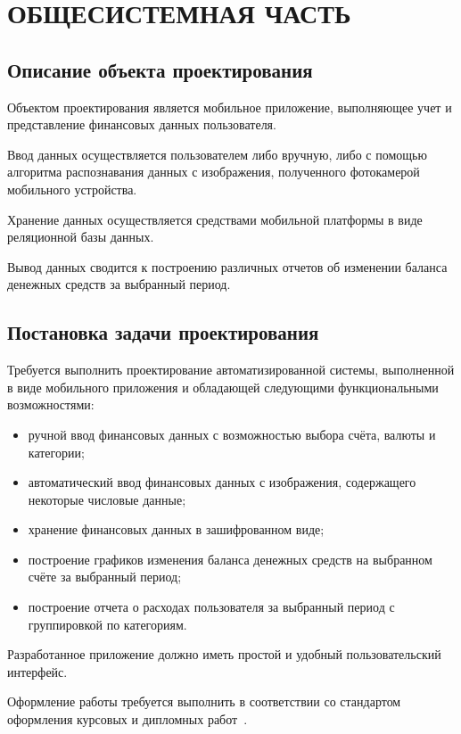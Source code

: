 \section[Общесистемная часть]{ОБЩЕСИСТЕМНАЯ ЧАСТЬ}

\subsection{Описание объекта проектирования}

Объектом проектирования является мобильное приложение,
выполняющее учет и представление финансовых данных пользователя.

Ввод данных осуществляется пользователем либо вручную,
либо с помощью алгоритма распознавания данных с изображения,
полученного фотокамерой мобильного устройства.

Хранение данных осуществляется средствами мобильной платформы в
виде реляционной базы данных.

Вывод данных сводится к построению различных отчетов об изменении
баланса денежных средств за выбранный период.

\subsection{Постановка задачи проектирования}

Требуется выполнить проектирование автоматизированной системы,
выполненной в виде мобильного приложения и обладающей следующими
функциональными возможностями:
\begin{itemize}
\item ручной ввод финансовых данных с возможностью выбора счёта,
  валюты и категории;
\item автоматический ввод финансовых данных с изображения,
  содержащего некоторые числовые данные;
\item хранение финансовых данных в зашифрованном виде;
\item построение графиков изменения баланса денежных средств
  на выбранном счёте за выбранный период;
\item построение отчета о расходах пользователя
  за выбранный период с группировкой по категориям.
\end{itemize}

Разработанное приложение должно иметь простой и удобный
пользовательский интерфейс.

Оформление работы требуется выполнить в соответствии
со стандартом оформления курсовых и дипломных работ~\cite{stp2013}.

